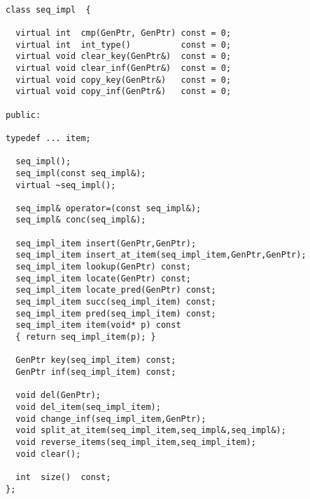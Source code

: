 \begin{verbatim}

class seq_impl  {

  virtual int  cmp(GenPtr, GenPtr) const = 0;
  virtual int  int_type()          const = 0;
  virtual void clear_key(GenPtr&)  const = 0;
  virtual void clear_inf(GenPtr&)  const = 0;
  virtual void copy_key(GenPtr&)   const = 0;
  virtual void copy_inf(GenPtr&)   const = 0;

public:

typedef ... item;

  seq_impl();
  seq_impl(const seq_impl&);
  virtual ~seq_impl();

  seq_impl& operator=(const seq_impl&);
  seq_impl& conc(seq_impl&);
 
  seq_impl_item insert(GenPtr,GenPtr);
  seq_impl_item insert_at_item(seq_impl_item,GenPtr,GenPtr);
  seq_impl_item lookup(GenPtr) const;
  seq_impl_item locate(GenPtr) const;
  seq_impl_item locate_pred(GenPtr) const;
  seq_impl_item succ(seq_impl_item) const;
  seq_impl_item pred(seq_impl_item) const;
  seq_impl_item item(void* p) const 
  { return seq_impl_item(p); }
 
  GenPtr key(seq_impl_item) const;
  GenPtr inf(seq_impl_item) const;
 
  void del(GenPtr); 
  void del_item(seq_impl_item); 
  void change_inf(seq_impl_item,GenPtr);
  void split_at_item(seq_impl_item,seq_impl&,seq_impl&);
  void reverse_items(seq_impl_item,seq_impl_item); 
  void clear();
 
  int  size()  const;
};
\end{verbatim}


